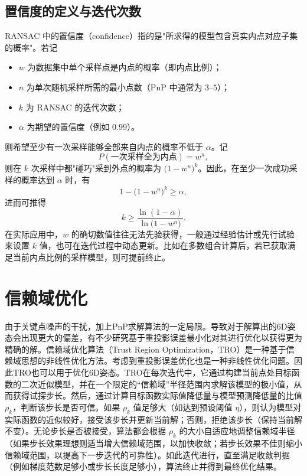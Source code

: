 \subsection{置信度的定义与迭代次数}
RANSAC 中的置信度（confidence）指的是"所求得的模型包含真实内点对应子集的概率"。若记
\begin{itemize}
	\item $w$ 为数据集中单个采样点是内点的概率（即内点比例）；
	\item $n$ 为单次随机采样所需的最小点数（PnP 中通常为 $3$--$5$）；
	\item $k$ 为 RANSAC 的迭代次数；
	\item $\alpha$ 为期望的置信度（例如 $0.99$）。
\end{itemize}
则希望至少有一次采样能够全部来自内点的概率不低于 $\alpha$。记
\begin{equation}
	P(\text{一次采样全为内点})  =  w^n,
\end{equation}
则在 $k$ 次采样中都"碰巧"采到外点的概率为 $\bigl(1 - w^n \bigr)^k$。因此，在至少一次成功采样的概率达到 $\alpha$ 时，有
\begin{equation}
	1 - \bigl(1 - w^n \bigr)^k   \ge   \alpha,
\end{equation}
进而可推得
\begin{equation}
	k  \ge  \frac{\ln(1 - \alpha)}{\ln\bigl(1 - w^n\bigr)}.
\end{equation}
在实际应用中，$w$ 的确切数值往往无法先验获得，一般通过经验估计或先行试验来设置 $k$ 值，也可在迭代过程中动态更新。比如在多数组合计算后，若已获取满足当前内点比例的采样模型，则可提前终止。


\vspace{1em}




\section{信赖域优化}

由于关键点噪声的干扰，加上PnP求解算法的一定局限。导致对于解算出的6D姿态会出现更大的偏差，有不少研究基于重投影误差最小化对其进行优化以获得更为精确的解\cite{10297555,guo2024joint}。信赖域优化算法（Trust Region Optimization，TRO）是一种基于信赖域思想的非线性优化方法。考虑到重投影误差优化也是一种非线性优化问题。因此TRO也可以用于优化6D姿态。TRO在每次迭代中，它通过构建当前点处目标函数的二次近似模型，并在一个限定的“信赖域”半径范围内求解该模型的极小值，从而获得试探步长。然后，通过计算目标函数实际值降低量与模型预测降低量的比值 $\rho_k$，判断该步长是否可信。如果 $\rho_k$ 值足够大（如达到预设阈值 $\eta$），则认为模型对实际函数的近似较好，接受该步长并更新当前解；否则，拒绝该步长（保持当前解不变）。无论步长是否被接受，算法都会根据 $\rho_k$ 的大小自适应地调整信赖域半径（如果步长效果理想则适当增大信赖域范围，以加快收敛；若步长效果不佳则缩小信赖域范围，以提高下一步迭代的可靠性）。如此迭代进行，直至满足收敛判据（例如梯度范数足够小或步长长度足够小），算法终止并得到最终优化结果。



